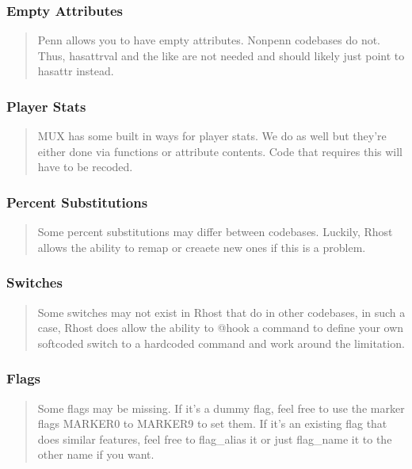 \documentclass[letterpaper,10pt,english]{sphinxmanual}
\begin{document}
\subsubsection{Empty Attributes}
\label{\detokenize{differences:empty-attributes}}\begin{quote}

\sphinxAtStartPar
Penn allows you to have empty attributes.  Non\sphinxhyphen{}penn codebases do not.
Thus, hasattrval and the like are not needed and should likely just point
to hasattr instead.
\end{quote}


\subsubsection{Player Stats}
\label{\detokenize{differences:player-stats}}\begin{quote}

\sphinxAtStartPar
MUX has some built in ways for player stats.  We do as well but they’re
either done via functions or attribute contents.  Code that requires this
will have to be recoded.
\end{quote}


\subsubsection{Percent Substitutions}
\label{\detokenize{differences:percent-substitutions}}\begin{quote}

\sphinxAtStartPar
Some percent substitutions may differ between codebases.  Luckily, Rhost
allows the ability to remap or creaete new ones if this is a problem.
\end{quote}


\subsubsection{Switches}
\label{\detokenize{differences:switches}}\begin{quote}

\sphinxAtStartPar
Some switches may not exist in Rhost that do in other codebases, in such
a case, Rhost does allow the ability to @hook a command to define your own
softcoded switch to a hardcoded command and work around the limitation.
\end{quote}


\subsubsection{Flags}
\label{\detokenize{differences:id3}}\begin{quote}

\sphinxAtStartPar
Some flags may be missing.  If it’s a dummy flag, feel free to use the
marker flags MARKER0 to MARKER9 to set them.  If it’s an existing flag
that does similar features, feel free to flag\_alias it or just flag\_name
it to the other name if you want.
\end{quote}
\end{document}
